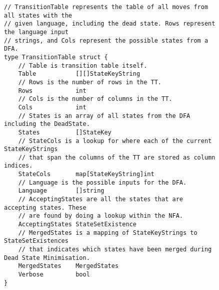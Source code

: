 \begin{figure}[H]    
    \begin{verbatim}
// TransitionTable represents the table of all moves from all states with the
// given language, including the dead state. Rows represent the language input
// strings, and Cols represent the possible states from a DFA.
type TransitionTable struct {
    // Table is transition table itself.
    Table           [][]StateKeyString
    // Rows is the number of rows in the TT.
    Rows            int
    // Cols is the number of columns in the TT.
    Cols            int
    // States is an array of all states from the DFA including the DeadState.
    States          []StateKey
    // StateCols is a lookup for where each of the current StateKeyStrings 
    // that span the columns of the TT are stored as column indices.
    StateCols       map[StateKeyString]int
    // Language is the possible inputs for the DFA.
    Language        []string
    // AcceptingStates are all the states that are accepting states. These 
    // are found by doing a lookup within the NFA.
    AcceptingStates StateSetExistence
    // MergedStates is a mapping of StateKeyStrings to StateSetExistences 
    // that indicates which states have been merged during Dead State Minimisation.
    MergedStates    MergedStates
    Verbose         bool
}
    \end{verbatim}
\end{figure}

